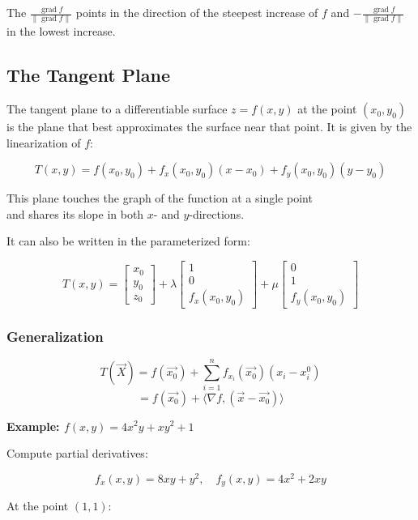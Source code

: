 The \(\frac{\operatorname{grad}f}{\|\operatorname{grad}f\|}\) points in the direction of the 
steepest increase of \(f\) and \(- \frac{\operatorname{grad}f}{\|\operatorname{grad}f\|}\) in 
the lowest increase.

\subsection{The Tangent Plane}

The tangent plane to a differentiable surface \( z = f(x, y) \) at the point \( (x_0, y_0) \) is the 
plane that best approximates the surface near that point. It is given by the linearization of \(f\):

\[
    T(x, y) = f(x_0, y_0) + f_x(x_0, y_0)(x - x_0) + f_y(x_0, y_0)(y - y_0)
\]

This plane touches the graph of the function at a single point\\
and shares its slope in both \(x\)- and \(y\)-directions.

It can also be written in the parameterized form:

\[
    T(x,y) = \begin{bmatrix} x_0\\ y_0\\ z_0\end{bmatrix} + \lambda 
    \begin{bmatrix} 1\\ 0 \\ f_x(x_0,y_0)\end{bmatrix} + \mu \begin{bmatrix}
    0 \\ 1 \\ f_y(x_0, y_0)
    \end{bmatrix}
\]

\subsubsection{Generalization}

\[
    T(\vec{X}) = f(\vec{x_0}) + \sum_{i = 1}^{n} f_{x_i}(\vec{x_0})(x_i - x_{i}^0)
\]
\[
    = f(\vec{x_0}) + \langle \nabla f, (\vec{x} - \vec{x_0})\rangle
\]

\textbf{Example: \( f(x, y) = 4x^2y + xy^2 + 1 \)}

Compute partial derivatives:

\[
    f_x(x, y) = 8xy + y^2, \quad f_y(x, y) = 4x^2 + 2xy
\]

At the point \( (1, 1) \):

